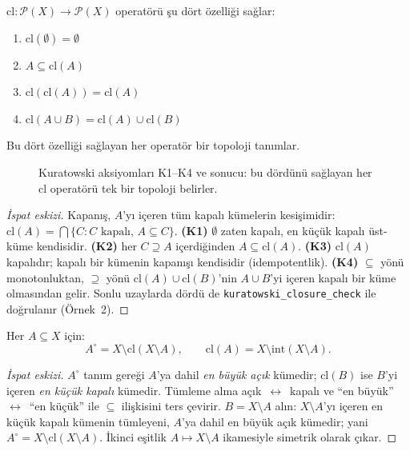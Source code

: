 \begin{theorem}
\label{thm:kuratowski}
$\mathrm{cl}: \mathcal{P}(X) \to \mathcal{P}(X)$ operatörü şu dört özelliği sağlar:
\begin{enumerate}
  \item[(K1)] $\mathrm{cl}(\emptyset) = \emptyset$
  \item[(K2)] $A \subseteq \mathrm{cl}(A)$
  \item[(K3)] $\mathrm{cl}(\mathrm{cl}(A)) = \mathrm{cl}(A)$
  \item[(K4)] $\mathrm{cl}(A \cup B) = \mathrm{cl}(A) \cup \mathrm{cl}(B)$
\end{enumerate}
Bu dört özelliği sağlayan her operatör bir topoloji tanımlar.
\end{theorem}

\begin{figure}[ht]
  \centering
  
  \caption{Kuratowski aksiyomları K1--K4 ve sonucu: bu dördünü sağlayan her
    $\mathrm{cl}$ operatörü tek bir topoloji belirler.}
  \label{fig:ch05:kuratowski}
\end{figure}

\begin{proof}[İspat eskizi]
Kapanış, $A$'yı içeren tüm kapalı kümelerin kesişimidir:
$\mathrm{cl}(A) = \bigcap\{C : C \text{ kapalı},\, A\subseteq C\}$.
\textbf{(K1)} $\emptyset$ zaten kapalı, en küçük kapalı üst-küme kendisidir.
\textbf{(K2)} her $C\supseteq A$ içerdiğinden $A\subseteq \mathrm{cl}(A)$.
\textbf{(K3)} $\mathrm{cl}(A)$ kapalıdır; kapalı bir kümenin kapanışı kendisidir
(idempotentlik). \textbf{(K4)} $\subseteq$ yönü monotonluktan, $\supseteq$ yönü
$\mathrm{cl}(A)\cup\mathrm{cl}(B)$'nin $A\cup B$'yi içeren kapalı bir küme olmasından gelir.
Sonlu uzaylarda dördü de \texttt{kuratowski\_closure\_check} ile doğrulanır (Örnek~2).
\end{proof}

\begin{theorem}
\label{thm:interior_closure_duality}
Her $A \subseteq X$ için:
\[
  A^\circ = X \setminus \mathrm{cl}(X \setminus A), \qquad
  \mathrm{cl}(A) = X \setminus \mathrm{int}(X \setminus A).
\]
\end{theorem}

\begin{proof}[İspat eskizi]
$A^\circ$ tanım gereği $A$'ya dahil \emph{en büyük açık} kümedir; $\mathrm{cl}(B)$ ise
$B$'yi içeren \emph{en küçük kapalı} kümedir. Tümleme alma açık~$\leftrightarrow$~kapalı
ve ``en büyük''~$\leftrightarrow$~``en küçük'' ile $\subseteq$ ilişkisini ters çevirir.
$B=X\setminus A$ alın: $X\setminus A$'yı içeren en küçük kapalı kümenin tümleyeni,
$A$'ya dahil en büyük açık kümedir; yani $A^\circ = X\setminus\mathrm{cl}(X\setminus A)$.
İkinci eşitlik $A\mapsto X\setminus A$ ikamesiyle simetrik olarak çıkar.
\end{proof}

